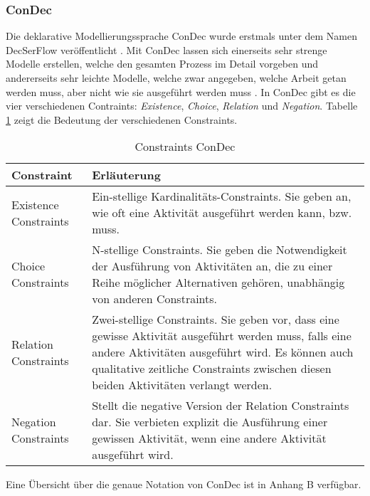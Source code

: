 \subsubsection{ConDec}

Die deklarative Modellierungssprache ConDec wurde erstmals unter dem Namen DecSerFlow veröffentlicht \cite{fahland2010}. Mit ConDec lassen sich einerseits sehr strenge Modelle erstellen, welche den gesamten Prozess im Detail vorgeben und andererseits sehr leichte Modelle, welche zwar angegeben, welche Arbeit getan werden muss, aber nicht wie sie ausgeführt werden muss \cite{pesic2006}. \newline
In ConDec gibt es die vier verschiedenen Contraints: \textit{Existence}, \textit{Choice}, \textit{Relation} und \textit{Negation}. Tabelle \ref{tab:tab3} zeigt die Bedeutung der verschiedenen Constraints. \newline

\begin{table}
\begin{tabular}{|p{}|p{}|}
\hline
\textbf{Constraint} & \textbf{Erläuterung}\\
\hline
Existence Constraints & Ein-stellige Kardinalitäts-Constraints. Sie geben an, wie oft eine Aktivität ausgeführt werden kann, bzw. muss.\\
\hline
Choice Constraints & N-stellige Constraints. Sie geben die Notwendigkeit der Ausführung von Aktivitäten an, die zu einer Reihe möglicher Alternativen gehören, unabhängig von anderen Constraints. \\
\hline
Relation Constraints & Zwei-stellige Constraints. Sie geben vor, dass eine gewisse Aktivität ausgeführt werden muss, falls eine andere Aktivitäten ausgeführt wird. Es können auch qualitative zeitliche Constraints zwischen diesen beiden Aktivitäten verlangt werden.\\
\hline
Negation Constraints & Stellt die negative Version der Relation Constraints dar. Sie verbieten explizit die Ausführung einer gewissen Aktivität, wenn eine andere Aktivität ausgeführt wird.\\
\hline
 \end{tabular}
  \caption{Constraints ConDec \cite{pesic2006}}
\label{tab:tab3}
 \end{table}
 
 Eine Übersicht über die genaue Notation von ConDec ist in Anhang B verfügbar.
 







